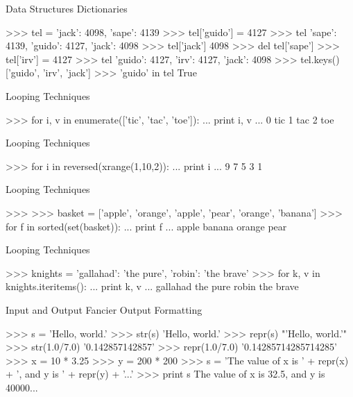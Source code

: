 \documentclass[11pt]{beamer}
\begin{document}
\begin{frame}[containsverbatim]{Data Structures}
Dictionaries
\begin{python}
>>> tel = {'jack': 4098, 'sape': 4139}
>>> tel['guido'] = 4127
>>> tel
{'sape': 4139, 'guido': 4127, 'jack': 4098}
>>> tel['jack']
4098
>>> del tel['sape']
>>> tel['irv'] = 4127
>>> tel
{'guido': 4127, 'irv': 4127, 'jack': 4098}
>>> tel.keys()
['guido', 'irv', 'jack']
>>> 'guido' in tel
True
\end{python}
\end{frame}


\begin{frame}[containsverbatim]{Looping Techniques}
\begin{python}
>>> for i, v in enumerate(['tic', 'tac', 'toe']):
...    print i, v
...
0 tic
1 tac
2 toe
\end{python}
\end{frame}

\begin{frame}[containsverbatim]{Looping Techniques}
\begin{python}
>>> for i in reversed(xrange(1,10,2)):
...    print i
...
9
7
5
3
1
\end{python}
\end{frame}

\begin{frame}[containsverbatim]{Looping Techniques}
\begin{python}
>>>
>>> basket = ['apple', 'orange', 'apple', 'pear', 'orange', 'banana']
>>> for f in sorted(set(basket)):
...    print f
...
apple
banana
orange
pear
\end{python}
\end{frame}

\begin{frame}[containsverbatim]{Looping Techniques}
\begin{python}
>>> knights = {'gallahad': 'the pure', 'robin': 'the brave'}
>>> for k, v in knights.iteritems():
...    print k, v
...
gallahad the pure
robin the brave
\end{python}
\end{frame}

\begin{frame}[containsverbatim]{Input and Output}
Fancier Output Formatting
\begin{python}
>>> s = 'Hello, world.'
>>> str(s)
'Hello, world.'
>>> repr(s)
"'Hello, world.'"
>>> str(1.0/7.0)
'0.142857142857'
>>> repr(1.0/7.0)
'0.14285714285714285'
>>> x = 10 * 3.25
>>> y = 200 * 200
>>> s = 'The value of x is ' + repr(x) + ', and y is ' + repr(y) + '...'
>>> print s
The value of x is 32.5, and y is 40000...

\end{python}
\end{frame}
\end{document}
